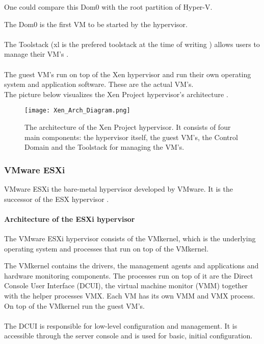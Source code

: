 One could compare this Dom0 with the root partition of Hyper-V.

The Dom0 is the first VM to be started by the hypervisor.\\ \\
The Toolstack (xl is the prefered toolstack at the time of writing \citep{Xen2}) allows users to manage their VM's \citep{Xen1}.\\ \\
The guest VM's run on top of the Xen hypervisor and run their own operating system and application software. These are the actual VM's. \\
The picture below visualizes the Xen Project hypervisor's architecture \citep{Xen2}.
\begin{figure}[h]
    \centering
    \texttt{[image: Xen\_Arch\_Diagram.png]}
    \caption[Xen architecture]{The architecture of the Xen Project hypervisor. It consists of four main components: the hypervisor itself, the guest VM's, the Control Domain and the Toolstack for managing the VM's.}
\end{figure}

\clearpage

\subsubsection{VMware ESXi}

VMware ESXi the bare-metal hypervisor developed by VMware. It is the successor of the ESX hypervisor \citep{VMware1}.

\paragraph{Architecture of the ESXi hypervisor}

The VMware ESXi hypervisor consists of the VMkernel, which is the underlying operating system and processes that run on top of the VMkernel.

The VMkernel contains the drivers, the management agents and applications and hardware monitoring components. The processes run on top of it are the Direct Console User Interface (DCUI), the virtual machine monitor (VMM) together with the helper processes VMX. Each VM has its own VMM and VMX process.
On top of the VMkernel run the guest VM's. \\ \\
The DCUI is responsible for low-level configuration and management. It is accessible through the server console and is used for basic, initial configuration.

